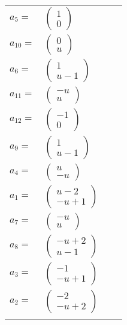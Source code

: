 \documentclass[1p]{elsarticle_modified}
\theoremstyle{definition}
\begin{document}
\begin{tabular}{m{7pt} m{180pt} m{7pt} m{180pt} }
\flushright $a_{5}=$&$\begin{pmatrix}1\\0\end{pmatrix}$ \\
\flushright $a_{10}=$&$\begin{pmatrix}0\\u\end{pmatrix}$ \\
\flushright $a_{6}=$&$\begin{pmatrix}1\\u-1\end{pmatrix}$ \\
\flushright $a_{11}=$&$\begin{pmatrix}- u\\u\end{pmatrix}$ \\
\flushright $a_{12}=$&$\begin{pmatrix}-1\\0\end{pmatrix}$ \\
\flushright $a_{9}=$&$\begin{pmatrix}1\\u-1\end{pmatrix}$ \\
\flushright $a_{4}=$&$\begin{pmatrix}u\\- u\end{pmatrix}$ \\
\flushright $a_{1}=$&$\begin{pmatrix}u-2\\- u+1\end{pmatrix}$ \\
\flushright $a_{7}=$&$\begin{pmatrix}- u\\u\end{pmatrix}$ \\
\flushright $a_{8}=$&$\begin{pmatrix}- u+2\\u-1\end{pmatrix}$ \\
\flushright $a_{3}=$&$\begin{pmatrix}-1\\- u+1\end{pmatrix}$ \\
\flushright $a_{2}=$&$\begin{pmatrix}-2\\- u+2\end{pmatrix}$\\&\end{tabular}
\end{document}
